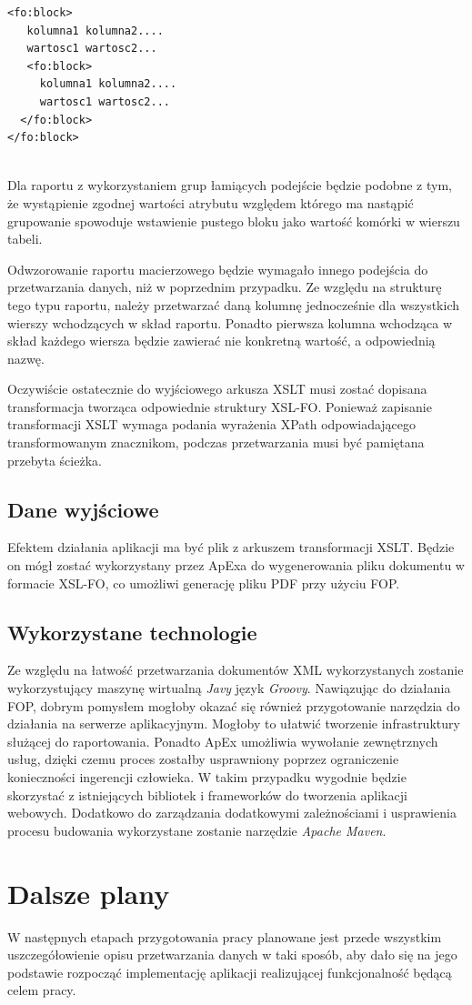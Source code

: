 \documentclass[11pt,a4paper]{article}
\begin{document}
\lstset{language=XML}
\begin{lstlisting}[frame=single,caption=Przykładowa struktura pliku XSL-FO,label=strukturaXSL]
<fo:block>
   kolumna1 kolumna2....
   wartosc1 wartosc2...
   <fo:block>
     kolumna1 kolumna2....
     wartosc1 wartosc2...	
  </fo:block>
</fo:block>


\end{lstlisting}

Dla raportu z wykorzystaniem grup łamiących podejście będzie podobne z tym, że wystąpienie zgodnej wartości atrybutu względem którego ma nastąpić grupowanie spowoduje wstawienie pustego bloku jako wartość komórki w wierszu tabeli.

Odwzorowanie raportu macierzowego będzie wymagało innego podejścia do przetwarzania danych, niż w poprzednim przypadku. Ze względu na strukturę tego typu raportu, należy przetwarzać daną kolumnę jednocześnie dla wszystkich wierszy wchodzących w skład raportu. Ponadto pierwsza kolumna wchodząca w skład każdego wiersza będzie zawierać nie konkretną wartość, a odpowiednią nazwę.

Oczywiście ostatecznie do wyjściowego arkusza XSLT musi zostać dopisana transformacja tworząca odpowiednie struktury XSL-FO. Ponieważ zapisanie transformacji XSLT wymaga podania wyrażenia XPath odpowiadającego transformowanym znacznikom, podczas przetwarzania musi być pamiętana przebyta ścieżka.

\subsection{Dane wyjściowe}\label{sec:appOutput}
 Efektem działania aplikacji ma być plik z arkuszem transformacji XSLT. Będzie on mógł zostać wykorzystany przez ApExa do wygenerowania pliku dokumentu w formacie XSL-FO, co umożliwi generację pliku PDF przy użyciu FOP.

\subsection{Wykorzystane technologie} \label{sec:appTech}
Ze względu na łatwość przetwarzania dokumentów XML wykorzystanych zostanie wykorzystujący maszynę wirtualną \emph{Javy} język \emph{Groovy}. Nawiązując do działania FOP, dobrym pomysłem mogłoby okazać się również przygotowanie narzędzia do działania na serwerze aplikacyjnym. Mogłoby to ułatwić tworzenie infrastruktury służącej do raportowania. Ponadto ApEx umożliwia wywołanie zewnętrznych usług, dzięki czemu proces zostałby usprawniony poprzez ograniczenie konieczności ingerencji człowieka. W takim przypadku wygodnie będzie skorzystać z istniejących bibliotek i frameworków do tworzenia aplikacji webowych. Dodatkowo do zarządzania dodatkowymi zależnościami i usprawienia procesu budowania wykorzystane zostanie narzędzie \emph{Apache Maven}.

\section{Dalsze plany}\label{sec:plany}
W następnych etapach przygotowania pracy planowane jest przede wszystkim uszczegółowienie opisu przetwarzania danych w taki sposób, aby dało się na jego podstawie rozpocząć implementację aplikacji realizującej funkcjonalność będącą celem pracy. 
\end{document}
